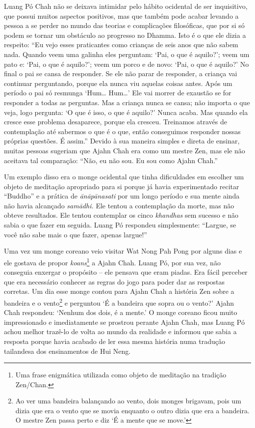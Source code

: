 Luang Pó Chah não se deixava intimidar pelo hábito ocidental de ser
inquisitivo, que possui muitos aspectos positivos, mas que também pode
acabar levando a pessoa a se perder no mundo das teorias e complicações
filosóficas, que por si só podem se tornar um obstáculo ao progresso no
Dhamma. Isto é o que ele dizia a respeito: ``Eu vejo esses praticantes
como crianças de seis anos que não sabem nada. Quando veem uma galinha
eles perguntam: `Pai, o que é aquilo?'; veem um pato e: `Pai, o que é
aquilo?'; veem um porco e de novo: `Pai, o que é aquilo?' No final o pai
se cansa de responder. Se ele não parar de responder, a criança vai
continuar perguntando, porque ela nunca viu aquelas coisas antes. Após
um período o pai só resmunga `Hum\ldots{} Hum\ldots{}' Ele vai morrer de
exaustão se for responder a todas as perguntas. Mas a criança nunca se
cansa; não importa o que veja, logo pergunta: `O que é isso, o que é
aquilo?' Nunca acaba. Mas quando ela cresce esse problema desaparece,
porque ela cresceu. Treinamos através de contemplação até sabermos o que
é o que, então conseguimos responder nossas próprias questões. É
assim.'' Devido à sua maneira simples e direta de ensinar, muitas
pessoas sugeriam que Ajahn Chah era como um mestre Zen, mas ele não
aceitava tal comparação: ``Não, eu não sou. Eu sou como Ajahn Chah.''

Um exemplo disso era o monge ocidental que tinha dificuldades em
escolher um objeto de meditação apropriado para si porque já havia
experimentado recitar ``Buddho'' e a prática de \emph{ānāpānasati} por
um longo período e sua mente ainda não havia alcançado \emph{samādhi.}
Ele tentou a contemplação da morte, mas não obteve resultados. Ele
tentou contemplar os cinco \emph{khandhas} sem sucesso e não sabia o que
fazer em seguida. Luang Pó respondeu simplesmente: ``Largue, se você não
sabe mais o que fazer, apenas largue!''

Uma vez um monge coreano veio visitar Wat Nong Pah Pong por alguns dias
e ele gostava de propor \emph{koans}\footnote{Uma frase enigmática
  utilizada como objeto de meditação na tradição Zen/Chan.} a Ajahn
Chah. Luang Pó, por sua vez, não conseguia enxergar o propósito -- ele
pensava que eram piadas. Era fácil perceber que era necessário conhecer
as regras do jogo para poder dar as respostas corretas. Um dia esse
monge contou para Ajahn Chah a história Zen sobre a bandeira e o
vento\footnote{Ao ver uma bandeira balançando ao vento, dois monges
  brigavam, pois um dizia que era o vento que se movia enquanto o outro
  dizia que era a bandeira. O mestre Zen passa perto e diz `É a mente
  que se move.'} e perguntou `É a bandeira que sopra ou o vento?' Ajahn
Chah respondeu: `Nenhum dos dois, é a mente.' O monge coreano ficou
muito impressionado e imediatamente se prostrou perante Ajahn Chah, mas
Luang Pó achou melhor trazê-lo de volta ao mundo da realidade e informou
que sabia a resposta porque havia acabado de ler essa mesma história
numa tradução tailandesa dos ensinamentos de Hui Neng.

